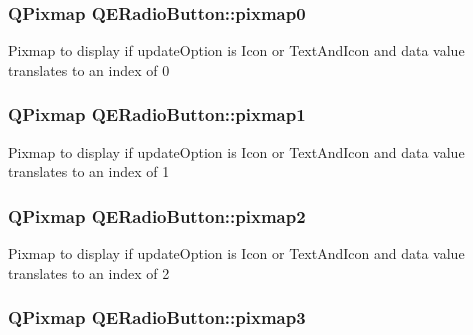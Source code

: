 \hypertarget{classQERadioButton_a80f82e420118a7ae1366d06472736f7b}{
\subsubsection[{pixmap0}]{\setlength{\rightskip}{0pt plus 5cm}QPixmap QERadioButton::pixmap0}}
\label{classQERadioButton_a80f82e420118a7ae1366d06472736f7b}
Pixmap to display if updateOption is Icon or TextAndIcon and data value translates to an index of 0 \hypertarget{classQERadioButton_a6ab9f2a2696ce973def9efb1e4b962c8}{
\subsubsection[{pixmap1}]{\setlength{\rightskip}{0pt plus 5cm}QPixmap QERadioButton::pixmap1}}
\label{classQERadioButton_a6ab9f2a2696ce973def9efb1e4b962c8}
Pixmap to display if updateOption is Icon or TextAndIcon and data value translates to an index of 1 \hypertarget{classQERadioButton_aa46673bac68cb15555002cd6d28a046d}{
\subsubsection[{pixmap2}]{\setlength{\rightskip}{0pt plus 5cm}QPixmap QERadioButton::pixmap2}}
\label{classQERadioButton_aa46673bac68cb15555002cd6d28a046d}
Pixmap to display if updateOption is Icon or TextAndIcon and data value translates to an index of 2 \hypertarget{classQERadioButton_af64fe5ac6300de6501a5ae92770e254f}{
\subsubsection[{pixmap3}]{\setlength{\rightskip}{0pt plus 5cm}QPixmap QERadioButton::pixmap3}}
\label{classQERadioButton_af64fe5ac6300de6501a5ae92770e254f}
